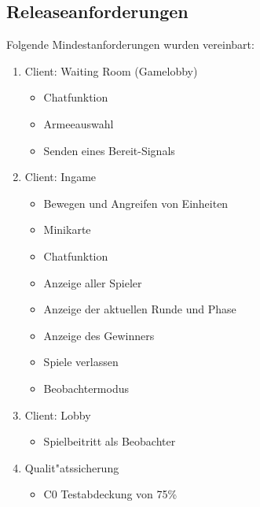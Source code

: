 \documentclass[12pt, titlepage]{scrartcl}
\begin{document}
        \subsection{Releaseanforderungen}
            Folgende Mindestanforderungen wurden vereinbart:
            \begin{enumerate}
                \item Client: Waiting Room (Gamelobby)
                \begin{itemize}
                    \item Chatfunktion
                    \item Armeeauswahl
                    \item Senden eines Bereit-Signals
                \end{itemize}
                \item Client: Ingame
                \begin{itemize}
                    \item Bewegen und Angreifen von Einheiten
                    \item Minikarte
                    \item Chatfunktion
                    \item Anzeige aller Spieler
                    \item Anzeige der aktuellen Runde und Phase
                    \item Anzeige des Gewinners
 			\item Spiele verlassen
			\item Beobachtermodus
                \end{itemize}
                \item Client: Lobby
                \begin{itemize}
                    \item Spielbeitritt als Beobachter
                \end{itemize}
                \item Qualit"atssicherung
                \begin{itemize}
                    \item C0 Testabdeckung von 75\%
                \end{itemize}
            \end{enumerate}
\end{document}

